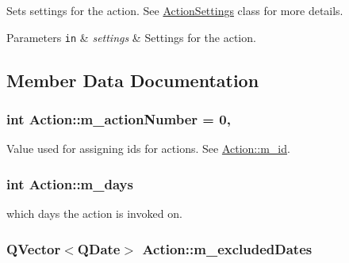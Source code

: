 Sets settings for the action. See \hyperlink{class_action_settings}{Action\-Settings} class for more details. 


\begin{DoxyParams}[1]{Parameters}
\mbox{\tt in}  & {\em settings} & Settings for the action. \\
\hline
\end{DoxyParams}


\subsection{Member Data Documentation}
\hypertarget{class_action_a00188e362b7f6b7740f514a7464e8eb2}{
\subsubsection[{m\-\_\-action\-Number}]{\setlength{\rightskip}{0pt plus 5cm}int Action\-::m\-\_\-action\-Number = 0\hspace{0.3cm}{\ttfamily [static]}, {\ttfamily [private]}}}\label{class_action_a00188e362b7f6b7740f514a7464e8eb2}


Value used for assigning ids for actions. See \hyperlink{class_action_a0f56dba599957c8a66d808c525cbd243}{Action\-::m\-\_\-id}. 

\hypertarget{class_action_a646d602d39e2b6c23dc2d398530614d0}{
\subsubsection[{m\-\_\-days}]{\setlength{\rightskip}{0pt plus 5cm}int Action\-::m\-\_\-days\hspace{0.3cm}{\ttfamily [private]}}}\label{class_action_a646d602d39e2b6c23dc2d398530614d0}


which days the action is invoked on. 

\hypertarget{class_action_a15acdea3b4df51d6c10d4870797a165b}{
\subsubsection[{m\-\_\-excluded\-Dates}]{\setlength{\rightskip}{0pt plus 5cm}Q\-Vector$<$Q\-Date$>$ Action\-::m\-\_\-excluded\-Dates\hspace{0.3cm}{\ttfamily [private]}}}\label{class_action_a15acdea3b4df51d6c10d4870797a165b}


